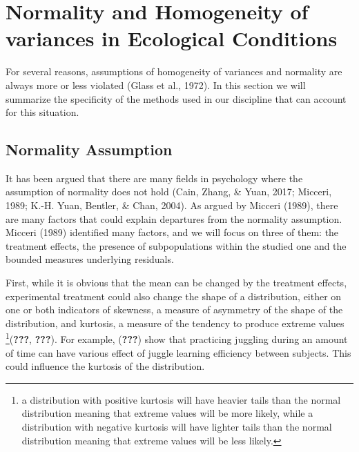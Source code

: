 \documentclass[man,floatsintext]{apa6}
\let\rmarkdownfootnote\footnote%
\def\footnote{\protect\rmarkdownfootnote}
\begin{document}
\section{Normality and Homogeneity of variances in Ecological
Conditions}\label{normality-and-homogeneity-of-variances-in-ecological-conditions}

For several reasons, assumptions of homogeneity of variances and
normality are always more or less violated (Glass et al., 1972). In this
section we will summarize the specificity of the methods used in our
discipline that can account for this situation.

\subsection{Normality Assumption}\label{normality-assumption}

It has been argued that there are many fields in psychology where the
assumption of normality does not hold (Cain, Zhang, \& Yuan, 2017;
Micceri, 1989; K.-H. Yuan, Bentler, \& Chan, 2004). As argued by Micceri
(1989), there are many factors that could explain departures from the
normality assumption. Micceri (1989) identified many factors, and we
will focus on three of them: the treatment effects, the presence of
subpopulations within the studied one and the bounded measures
underlying residuals.

First, while it is obvious that the mean can be changed by the treatment
effects, experimental treatment could also change the shape of a
distribution, either on one or both indicators of skewness, a measure of
asymmetry of the shape of the distribution, and kurtosis, a measure of
the tendency to produce extreme values
\footnote{a distribution with positive kurtosis will have heavier tails than the normal distribution meaning that extreme values will be more likely, while a distribution with negative kurtosis will have lighter tails than the normal distribution meaning that extreme values will be less likely.}({\textbf{???}},
{\textbf{???}}). For example, ({\textbf{???}}) show that practicing
juggling during an amount of time can have various effect of juggle
learning efficiency between subjects. This could influence the kurtosis
of the distribution.
\end{document}
